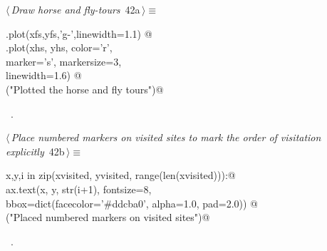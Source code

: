 \documentclass[11.5pt]{report}
\begin{document}
\begin{flushleft} \small
\begin{minipage}{\linewidth}\label{scrap54}\raggedright\small
{} $\langle\,${\itshape Draw horse and fly-tours}\nobreak\ {\footnotesize {42a}}$\,\rangle\equiv$
\vspace{-1ex}
\begin{list}{}{} \item
\mbox{}\verb@ax.plot(xfs,yfs,'g-',linewidth=1.1)  @\\
\mbox{}\verb@ax.plot(xhs, yhs, color='r', \@\\
\mbox{}\verb@        marker='s', markersize=3, \@\\
\mbox{}\verb@        linewidth=1.6) @\\
\mbox{}\verb@debug("Plotted the horse and fly tours")@\\
\mbox{}\verb@@{\NWsep}
\end{list}
\vspace{-1.5ex}
\footnotesize
\begin{list}{}{\setlength{\itemsep}{-\parsep}\setlength{\itemindent}{-\leftmargin}}
\item \NWtxtMacroRefIn\ .

\item{}
\end{list}
\end{minipage}\vspace{4ex}
\end{flushleft}

\begin{flushleft} \small\label{scrap55}\raggedright\small
{} $\langle\,${\itshape Place numbered markers on visited sites to mark the order of visitation explicitly}\nobreak\ {\footnotesize {42b}}$\,\rangle\equiv$
\vspace{-1ex}
\begin{list}{}{} \item
\mbox{}\verb@for x,y,i in zip(xvisited, yvisited, range(len(xvisited))):@\\
\mbox{}\verb@     ax.text(x, y, str(i+1),  fontsize=8, \@\\
\mbox{}\verb@             bbox=dict(facecolor='#ddcba0', alpha=1.0, pad=2.0)) @\\
\mbox{}\verb@debug("Placed numbered markers on visited sites")@\\
\mbox{}\verb@@{\NWsep}
\end{list}
\vspace{-1.5ex}
\footnotesize
\begin{list}{}{\setlength{\itemsep}{-\parsep}\setlength{\itemindent}{-\leftmargin}}
\item \NWtxtMacroRefIn\ .

\item{}
\end{list}
\vspace{4ex}
\end{flushleft}
\end{document}
